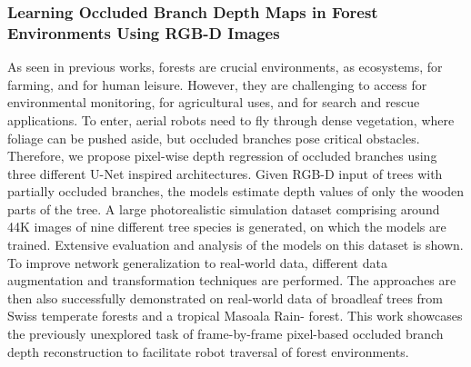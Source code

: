 \subsubsection{Learning Occluded Branch Depth Maps in Forest Environments Using RGB-D Images \cite{Geckeler2024}}

As seen in previous works, forests are crucial environments, as ecosystems, for farming, and for human leisure. However, they are challenging to access for environmental monitoring, for agricultural uses, and for search and rescue applications. To enter, aerial robots need to fly through dense vegetation, where foliage can be pushed aside, but occluded branches pose critical obstacles. Therefore, we propose pixel-wise depth regression of occluded branches using three different U-Net inspired architectures. Given RGB-D input of trees with partially occluded branches, the models estimate depth values of only the wooden parts of the tree. A large photorealistic simulation dataset comprising around 44K images of nine different tree species is generated, on which the models are trained. Extensive evaluation and analysis of the models on this dataset is shown. To improve network generalization to real-world data, different data augmentation and transformation techniques are performed. The approaches are then also successfully demonstrated on real-world data of broadleaf trees from Swiss temperate forests and a tropical Masoala Rain- forest. This work showcases the previously unexplored task of frame-by-frame pixel-based occluded branch depth reconstruction to facilitate robot traversal of forest environments.

